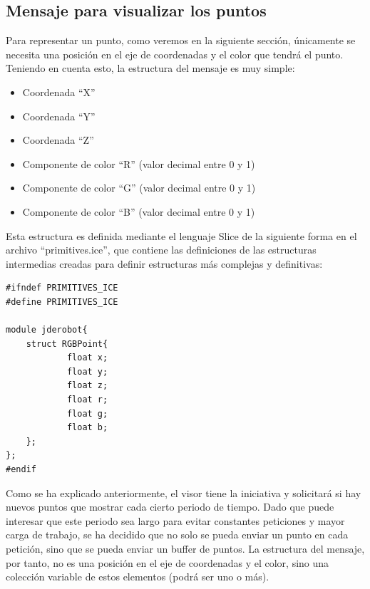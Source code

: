 \subsection{Mensaje para visualizar los puntos}
Para representar un punto, como veremos en la siguiente sección, únicamente se necesita una posición en el eje de coordenadas y el color que tendrá el punto. Teniendo en cuenta esto, la estructura del mensaje es muy simple:
\begin{itemize}
\item Coordenada ``X''
\item Coordenada ``Y''
\item Coordenada ``Z''
\item Componente de color ``R'' (valor decimal entre 0 y 1)
\item Componente de color ``G'' (valor decimal entre 0 y 1)
\item Componente de color ``B'' (valor decimal entre 0 y 1)
\end{itemize}

Esta estructura es definida mediante el lenguaje Slice de la siguiente forma en el archivo ``primitives.ice'', que contiene las definiciones de las estructuras intermedias creadas para definir estructuras más complejas y definitivas:

\begin{lstlisting}[caption= Definición de la estrucutra del punto con Slice, label=cod.puntoslice]
#ifndef PRIMITIVES_ICE
#define PRIMITIVES_ICE

module jderobot{
	struct RGBPoint{
      		float x;
      		float y;
      		float z;
      		float r;
      		float g;
      		float b;
	};
};
#endif
\end{lstlisting}

Como se ha explicado anteriormente, el visor tiene la iniciativa y solicitará si hay nuevos puntos que mostrar cada cierto periodo de tiempo. Dado que puede interesar que este periodo sea largo para evitar constantes peticiones y mayor carga de trabajo, se ha decidido que no solo se pueda enviar un punto en cada petición, sino que se pueda enviar un buffer de puntos. La estructura del mensaje, por tanto, no es una posición en el eje de coordenadas y el color, sino una colección variable de estos elementos (podrá ser uno o más).

